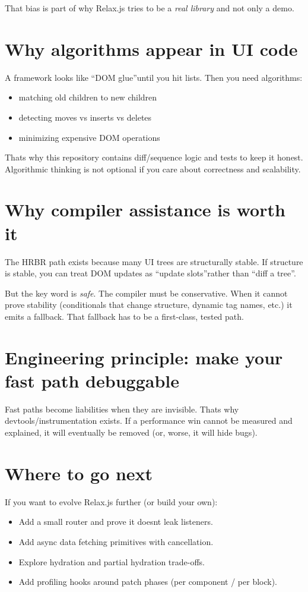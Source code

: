 That bias is part of why Relax.js tries to be a \emph{real library} and not only a demo.

\section{Why algorithms appear in UI code}
A framework looks like \textquotedblleft DOM glue\textquotedblright until you hit lists.
Then you need algorithms:

\begin{itemize}
  \item matching old children to new children
  \item detecting moves vs inserts vs deletes
  \item minimizing expensive DOM operations
\end{itemize}

That\textquotesingle s why this repository contains diff/sequence logic and tests to keep it honest.
Algorithmic thinking is not optional if you care about correctness and scalability.

\section{Why compiler assistance is worth it}
The HRBR path exists because many UI trees are structurally stable.
If structure is stable, you can treat DOM updates as \textquotedblleft update slots\textquotedblright rather than \textquotedblleft diff a tree\textquotedblright.

But the key word is \emph{safe}.
The compiler must be conservative.
When it cannot prove stability (conditionals that change structure, dynamic tag names, etc.) it emits a fallback.
That fallback has to be a first-class, tested path.

\section{Engineering principle: make your fast path debuggable}
Fast paths become liabilities when they are invisible.
That\textquotesingle s why devtools/instrumentation exists.
If a performance win cannot be measured and explained, it will eventually be removed (or, worse, it will hide bugs).

\section{Where to go next}
If you want to evolve Relax.js further (or build your own):

\begin{itemize}
  \item Add a small router and prove it doesn\textquotesingle t leak listeners.
  \item Add async data fetching primitives with cancellation.
  \item Explore hydration and partial hydration trade-offs.
  \item Add profiling hooks around patch phases (per component / per block).
\end{itemize}
